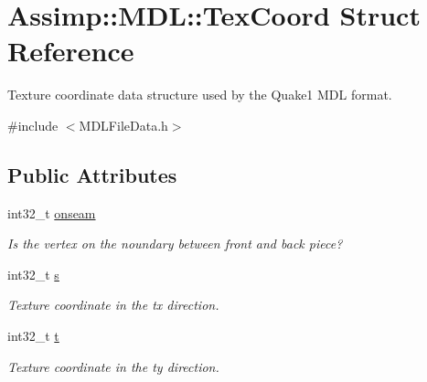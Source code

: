 \hypertarget{struct_assimp_1_1_m_d_l_1_1_tex_coord}{\section{Assimp\+:\+:M\+D\+L\+:\+:Tex\+Coord Struct Reference}
\label{struct_assimp_1_1_m_d_l_1_1_tex_coord}
}


Texture coordinate data structure used by the Quake1 M\+D\+L format.  




{\ttfamily \#include $<$M\+D\+L\+File\+Data.\+h$>$}

\subsection*{Public Attributes}
\begin{DoxyCompactItemize}
\item 
\hypertarget{struct_assimp_1_1_m_d_l_1_1_tex_coord_a287ffe72ac89b899ee91161a55e49007}{int32\+\_\+t \hyperlink{struct_assimp_1_1_m_d_l_1_1_tex_coord_a287ffe72ac89b899ee91161a55e49007}{onseam}}\label{struct_assimp_1_1_m_d_l_1_1_tex_coord_a287ffe72ac89b899ee91161a55e49007}

\begin{DoxyCompactList}\small\item\em Is the vertex on the noundary between front and back piece? \end{DoxyCompactList}\item 
\hypertarget{struct_assimp_1_1_m_d_l_1_1_tex_coord_a4e67fac97c4be19ef2a653667f1ca5ed}{int32\+\_\+t \hyperlink{struct_assimp_1_1_m_d_l_1_1_tex_coord_a4e67fac97c4be19ef2a653667f1ca5ed}{s}}\label{struct_assimp_1_1_m_d_l_1_1_tex_coord_a4e67fac97c4be19ef2a653667f1ca5ed}

\begin{DoxyCompactList}\small\item\em Texture coordinate in the tx direction. \end{DoxyCompactList}\item 
\hypertarget{struct_assimp_1_1_m_d_l_1_1_tex_coord_a3c37308530cab5bae6785ad4ba968f05}{int32\+\_\+t \hyperlink{struct_assimp_1_1_m_d_l_1_1_tex_coord_a3c37308530cab5bae6785ad4ba968f05}{t}}\label{struct_assimp_1_1_m_d_l_1_1_tex_coord_a3c37308530cab5bae6785ad4ba968f05}

\begin{DoxyCompactList}\small\item\em Texture coordinate in the ty direction. \end{DoxyCompactList}\end{DoxyCompactItemize}


